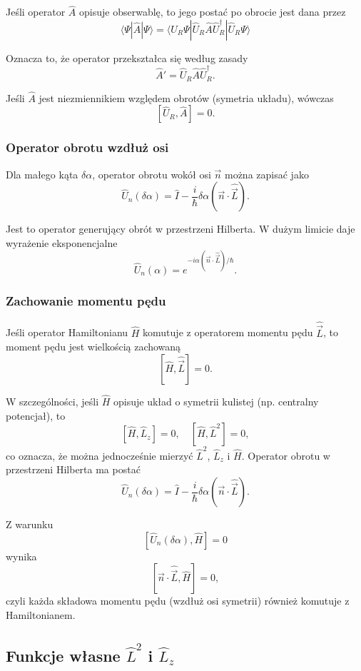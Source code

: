 Jeśli operator $\hat{A}$ opisuje obserwablę, to jego postać po obrocie jest dana przez
$$
\langle \Psi | \hat{A} | \Psi \rangle = \langle \hat{U}_R \Psi | \hat{U}_R \hat{A} \hat{U}_R^\dagger | \hat{U}_R \Psi \rangle
$$

Oznacza to, że operator przekształca się według zasady
$$
\hat{A}' = \hat{U}_R \hat{A} \hat{U}_R^\dagger.
$$

Jeśli $\hat{A}$ jest niezmiennikiem względem obrotów (symetria układu), wówczas
$$
[\hat{U}_R, \hat{A}] = 0.
$$

\subsubsection*{Operator obrotu wzdłuż osi}
Dla małego kąta $\delta\alpha$, operator obrotu wokół osi $\vec{n}$ można zapisać jako
$$
\hat{U}_n(\delta\alpha) = \hat{I} - \frac{i}{\hbar} \delta\alpha (\vec{n} \cdot \hat{\vec{L}}).
$$

Jest to operator generujący obrót w przestrzeni Hilberta. W dużym limicie daje wyrażenie eksponencjalne
$$
\hat{U}_n(\alpha) = e^{-i \alpha (\vec{n} \cdot \hat{\vec{L}})/\hbar}.
$$

\subsubsection*{Zachowanie momentu pędu}
Jeśli operator Hamiltonianu $\hat{H}$ komutuje z operatorem momentu pędu $\hat{\vec{L}}$, to moment pędu jest wielkością zachowaną
$$
[\hat{H}, \hat{\vec{L}}] = 0.
$$

W szczególności, jeśli $\hat{H}$ opisuje układ o symetrii kulistej (np. centralny potencjał), to
$$
[\hat{H}, \hat{L}_z] = 0, \quad [\hat{H}, \hat{L}^2] = 0,
$$
co oznacza, że można jednocześnie mierzyć $\hat{L}^2$, $\hat{L}_z$ i $\hat{H}$. Operator obrotu w przestrzeni Hilberta ma postać
$$
\hat{U}_n(\delta \alpha) = \hat{I} - \frac{i}{\hbar} \delta \alpha (\vec{n} \cdot \hat{\vec{L}}).
$$

Z warunku
$$
[\hat{U}_n(\delta \alpha), \hat{H}] = 0
$$
wynika
$$
[\vec{n} \cdot \hat{\vec{L}}, \hat{H}] = 0,
$$
czyli każda składowa momentu pędu (wzdłuż osi symetrii) również komutuje z Hamiltonianem.


\subsection{Funkcje własne \texorpdfstring{$\hat{L}^2$}{L2} i \texorpdfstring{$\hat{L}_z$}{Lz}}

